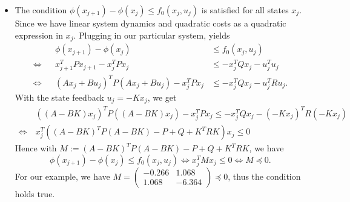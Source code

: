 \documentclass[]{article}
\newcommand{\trp}{^T}
\newcommand{\xj}{x_j}
\newcommand{\xjplus}{x_{j+1}}
\newcommand{\uj}{u_j}
\newcommand{\matricks}[4]{\begin{pmatrix}#1 & #2 \\ #3 & #4 \end{pmatrix}}
\newcommand{\fnull}{f_0}
\begin{document}
\begin{enumerate}
\begin{itemize}
					\item  The condition  $ \phi(x_{j+1}) - \phi(\xj) \leq \fnull(\xj,\uj) $  is satisfied for all states $ \xj $.\\
						Since we have linear system dynamics and quadratic costs as a quadratic expression in $ \xj $.
						Plugging in our particular system, yields
						\begin{align}
							& &\phi(x_{j+1}) - \phi(\xj) &\leq \fnull(\xj,\uj) \label{it:second}\\
							\Longleftrightarrow & & \xjplus \trp P \xjplus - \xj \trp P\xj &\leq -\xj\trp Q\xj -\uj \trp \uj \\
							\Longleftrightarrow & & (A\xj + B\uj)\trp P (A\xj + B\uj)- \xj \trp P\xj &\leq -\xj \trp Q \xj - \uj  \trp R \uj.
						\end{align}
						With the state feedback $ \uj = -K\xj $, we get
						\begin{align}
							 &((A - BK)\xj)\trp P ((A - BK)\xj) - \xj \trp P\xj \leq -\xj \trp Q \xj - (-K\xj)  \trp R (-K\xj)\\
							\Longleftrightarrow \ & \xj \trp ((A - BK)\trp P(A - BK) - P + Q + K\trp R K)\xj \leq 0
						\end{align}
						Hence with $ M := (A - BK)\trp P(A - BK) - P + Q + K\trp R K $, we have \[ \phi(x_{j+1}) - \phi(\xj) \leq \fnull(\xj,\uj)  \Longleftrightarrow \xj \trp M \xj \leq 0 \Longleftrightarrow M \preccurlyeq 0 . \]
						For our example, we have $ M = \matricks{-0.266}{1.068}{1.068}{-6.364} \preccurlyeq 0 $, thus the condition holds true. 
						

\end{itemize}
\end{enumerate}
\end{document}
